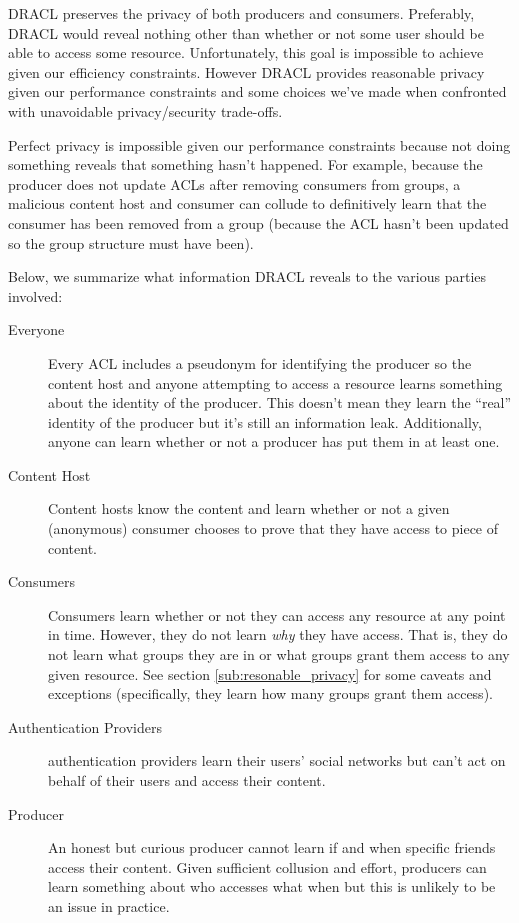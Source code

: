 \documentclass[pdftex,12pt,a4papaer,twoside,notitlepage]{report}
\begin{document}
DRACL preserves the privacy of both producers and consumers. Preferably, DRACL
would reveal nothing other than whether or not some user should be able to
access some resource. Unfortunately, this goal is impossible to achieve given
our efficiency constraints. However DRACL provides reasonable privacy given our
performance constraints and some choices we've made when confronted with
unavoidable privacy/security trade-offs.

Perfect privacy is impossible given our performance constraints because not
doing something reveals that something hasn't happened. For example, because the
producer does not update ACLs after removing consumers from groups, a malicious
content host and consumer can collude to definitively learn that the consumer
has been removed from a group (because the ACL hasn't been updated so the group
structure must have been).

Below, we summarize what information DRACL reveals to the various parties involved:

\begin{description}
\item[Everyone] Every ACL includes a pseudonym for identifying the producer so
  the content host and anyone attempting to access a resource learns something
  about the identity of the producer. This doesn't mean they learn the ``real''
  identity of the producer but it's still an information leak. Additionally,
  anyone can learn whether or not a producer has put them in at least one.
\item[Content Host] Content hosts know the content and learn whether or not a
  given (anonymous) consumer chooses to prove that they have access to piece of
  content.
\item[Consumers] Consumers learn whether or not they can access any resource at
  any point in time. However, they do not learn \emph{why} they have access.
  That is, they do not learn what groups they are in or what groups grant them
  access to any given resource. See section \ref{sub:resonable_privacy} for
  some caveats and exceptions (specifically, they learn how many groups grant
  them access).
\item[Authentication Providers] authentication providers learn their users'
  social networks but can't act on behalf of their users and access their
  content.
\item[Producer] An honest but curious producer cannot learn if and
  when specific friends access their content. Given sufficient collusion and
  effort, producers can learn something about who accesses what when but
  this is unlikely to be an issue in practice.
\end{description}
\end{document}
